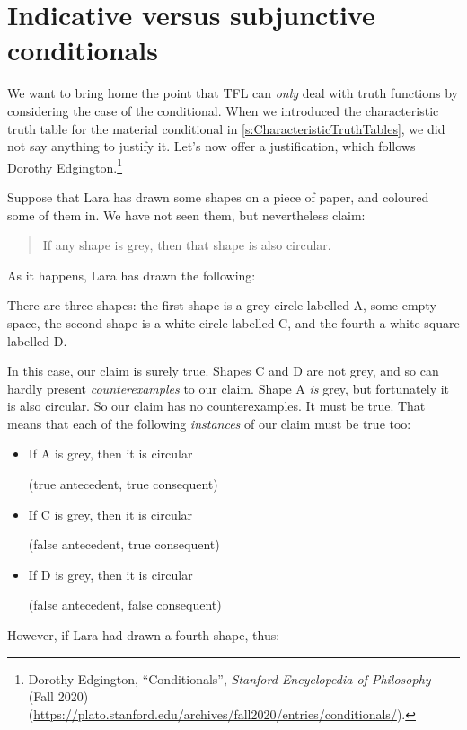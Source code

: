 \section{Indicative versus subjunctive conditionals}\label{s:IndicativeSubjunctive}
We want to bring home the point that TFL can \emph{only} deal with
truth functions by considering the case of the conditional. When we
introduced the characteristic truth table for the material conditional
in \cref{s:CharacteristicTruthTables}, we did not say anything to
justify it. Let's now offer a justification, which follows Dorothy
Edgington.\footnote{Dorothy Edgington, ``Conditionals'',
\textit{Stanford Encyclopedia of Philosophy} (Fall 2020)
(\url{https://plato.stanford.edu/archives/fall2020/entries/conditionals/}).} 

Suppose that Lara has drawn some shapes on a piece of paper, and coloured some of them in. We have not seen them, but nevertheless claim:
	\begin{quote}
		If any shape is grey, then that shape is also circular.
	\end{quote}
As it happens, Lara has drawn the following:

\begin{center}
\begin{arialabel}{There are three shapes: the first shape is a grey circle labelled A, some empty space, the second shape is a white circle labelled C, and the fourth a white square labelled D.}
\end{arialabel}
\end{center}

\noindent In this case, our claim is surely true.  Shapes C and D are not grey, and so can hardly present \emph{counterexamples} to our claim. Shape A \emph{is} grey, but fortunately it is also circular. So our claim has no counterexamples. It must be true. That means that each of the following \emph{instances} of our claim must be true too:
	\begin{itemize}
		\item If A is grey, then it is circular

		\qquad (true antecedent, true consequent)
		\item If C is grey, then it is circular

		\qquad (false antecedent, true consequent)
		\item If D is grey, then it is circular

		\qquad (false antecedent, false consequent)
	\end{itemize}
However, if Lara had drawn a fourth shape, thus:

